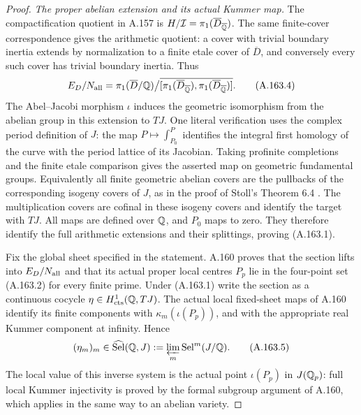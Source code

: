 \begin{proof}
\emph{The proper abelian extension and its actual Kummer map.}
The compactification quotient in A.157 is
\(H/\mathcal I=\pi_1(\overline D_{\overline{\mathbb Q}})\).
The same finite-cover correspondence gives the arithmetic
quotient: a cover with trivial boundary inertia extends
by normalization to a finite etale cover of
\(\overline D\), and conversely every such cover has
trivial boundary inertia.  Thus
\[
 E_D/N_{\rm all}
   =\pi_1(\overline D/\mathbb Q)\big/
       \overline{[\pi_1(\overline D_{\overline{\mathbb Q}}),
        \pi_1(\overline D_{\overline{\mathbb Q}})]}.
\tag{A.163.4}
\]
The Abel--Jacobi morphism \(\iota\) induces the
geometric isomorphism from the abelian group in this
extension to \(TJ\).  One literal verification uses
the complex period definition of \(J\): the map
\(P\mapsto\int_{P_0}^P\) identifies the integral
first homology of the curve with the period lattice
of its Jacobian.  Taking profinite completions and
the finite etale comparison gives the asserted map
on geometric fundamental groups.  Equivalently all
finite geometric abelian covers are the pullbacks
of the corresponding isogeny covers of \(J\),
as in the proof of Stoll's Theorem 6.4
\cite[Theorem 6.4 and its proof]{LegStoll2007}.
The multiplication covers are cofinal in these
isogeny covers and identify the target with \(TJ\).
All maps are defined over \(\mathbb Q\), and \(P_0\)
maps to zero.  They therefore identify the full
arithmetic extensions and their splittings, proving
(A.163.1).

Fix the global sheet specified in the statement.
A.160 proves that the section lifts into
\(E_D/N_{\rm all}\) and that its actual proper
local centres \(P_p\) lie in the four-point set
(A.163.2) for every finite prime.  Under (A.163.1)
write the section as a continuous cocycle
\(\eta\in H^1_{\rm cts}(\mathbb Q,TJ)\).  The actual
local fixed-sheet maps of A.160 identify its finite
components with
\(\kappa_m(\iota(P_p))\), and with the appropriate
real Kummer component at infinity.  Hence
\[
             (\eta_m)_m\in
              \widehat{\operatorname{Sel}}(\mathbb Q,J)
                 :=\varprojlim_m\operatorname{Sel}^m(J/\mathbb Q).
\tag{A.163.5}
\]
The local value of this inverse system is the actual
point \(\iota(P_p)\) in \(J(\mathbb Q_p)\): full local
Kummer injectivity is proved by the formal subgroup
argument of A.160, which applies in the same way to
an abelian variety.


\end{proof}
